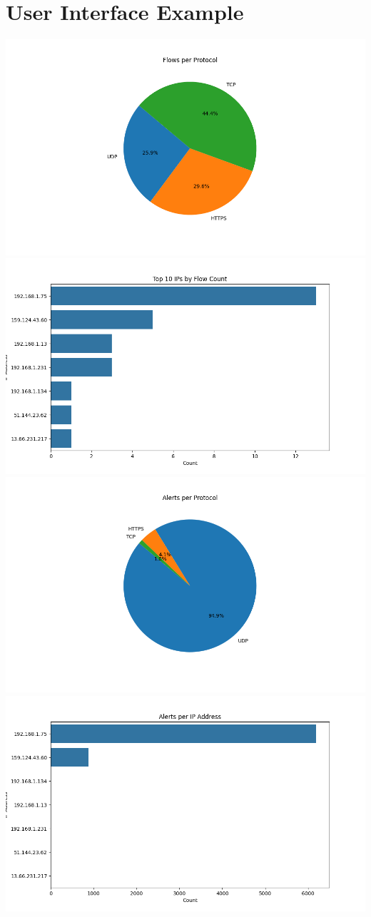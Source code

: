 \documentclass{article}
\begin{document}
\section{User Interface Example}
\label{sec:ui}
\includegraphics[width=\textwidth]{Screenshots/Flows_per_Protocol.png}
\includegraphics[width=\textwidth]{Screenshots/Top_10_IPs_by_Flow_Count.png}
\includegraphics[width=\textwidth]{Screenshots/Alerts_per_Protocol.png}
\includegraphics[width=\textwidth]{Screenshots/Alerts_per_IP_Address.png}
\end{document}
